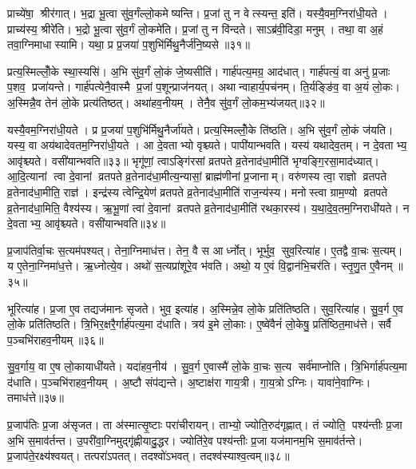 प्राच्ये॑षा॒ श्रीर॑गात्। भ॒द्रा भू॒त्वा सु॑व॒र्गंल्लो॒कमेष्यन्ति। प्र॒जां तु न वेत्स्यन्त॒ इति॑। यस्यै॒वम॒ग्निरा॑धी॒यते। प्राच्य॑स्य॒ श्रीरे॑ति। भ॒द्रो भू॒त्वा सु॑व॒र्गं लो॒कमे॑ति। प्र॒जां तु न वि॑न्दते। साऽब्र॑वी॒दिडा॒ मनुम्। तथा॒ वा अ॒हं तवा॒ग्निमाधास्यामि। यथा॒ प्र प्र॒जया॑ प॒शुभि॑र्मिथु॒नैर्ज॑नि॒ष्यसे॥३१॥

प्रत्य॒स्मिल्लोँ॒के स्था॒स्यसि॑। अ॒भि सु॑व॒र्गं लो॒कं जे॒ष्यसीति॑। गार्\mbox{}ह॑पत्य॒मग्र॒ आद॑धात्। गार्\mbox{}ह॑पत्यं॒ वा अनु॑ प्र॒जाः प॒शव॒ प्रजा॑यन्ते। गार्\mbox{}ह॑पत्येनै॒वास्मै प्र॒जां प॒शून्प्राज॑नयत्। अथान्वाहार्य॒पच॑नम्। ति॒र्यङ्ङि॑व॒ वा अ॒यं लो॒कः। अ॒स्मिन्नै॒व तेन॑ लो॒के प्रत्य॑तिष्ठत्। अथा॑हव॒नीयम्। तेनै॒व सु॑व॒र्गं लो॒कम॒भ्य॑जयत्॥३२॥

यस्यै॒वम॒ग्निरा॑धी॒यते। प्र प्र॒जया॑ प॒शुभि॑र्मिथु॒नैर्जा॑यते। प्रत्य॒स्मिल्लोँ॒के ति॑ष्ठति। अ॒भि सु॑व॒र्गं लो॒कं ज॑यति। यस्य॒ वा अय॑थादेवतम॒ग्निरा॑धी॒यते। आ दे॒वताभ्यो वृश्च्यते। पापी॑यान्भवति। यस्य॑ यथादेव॒तम्। न दे॒वताभ्य॒ आवृ॑श्च्यते। वसी॑यान्भवति॥३३॥ भृगू॑णां॒ त्वाऽङ्गि॑रसां व्रतपते व्र॒तेनाद॑धा॒मीति॑ भृग्वङ्गि॒रसा॒माद॑ध्यात्। आ॒दि॒त्यानां त्वा दे॒वानां व्रतपते व्र॒तेनाद॑धा॒मीत्य॒न्यासां॒ ब्राह्म॑णीनां प्र॒जानाम्। वरु॑णस्य त्वा॒ राज्ञो व्रतपते व्र॒तेनाद॑धा॒मीति॒ राज्ञ॑। इन्द्र॑स्य त्वेन्द्रि॒येण॑ व्रतपते व्र॒तेनाद॑धा॒मीति॑ राज॒न्य॑स्य। मनोस्त्वा ग्राम॒ण्यो व्रतपते व्र॒तेनाद॑धा॒मिति॒ वैश्य॑स्य। ऋ॒भू॒णां त्वा॑ दे॒वानां व्रतपते व्र॒तेनाद॑धा॒मीति॑ रथका॒रस्य॑। य॒था॒दे॒व॒तम॒ग्निराधी॑यते। न दे॒वताभ्य॒ आवृ॑श्च्यते। वसी॑यान्भवति॥३४॥

प्र॒जाप॑तिर्वा॒चः स॒त्यम॑पश्यत्। तेना॒ग्निमाध॑त्त। तेन॒ वै स आर्ध्नोत्। भूर्भुव॒ सुव॒रित्या॑ह। ए॒तद्वै वा॒चः स॒त्यम्। य ए॒तेना॒ग्निमा॑ध॒त्ते। ऋ॒ध्नोत्ये॒व। अथो॑ स॒त्यप्रा॑शूरे॒व भ॑वति। अथो॒ य ए॒वं वि॒द्वान॑भि॒चर॑ति। स्तृ॒णु॒त ए॒वैनम्॥३५॥

भूरित्या॑ह। प्र॒जा ए॒व तद्यज॑मानः सृजते। भुव॒ इत्या॑ह। अ॒स्मिन्ने॒व लो॒के प्रति॑तिष्ठति। सुव॒रित्या॑ह। सु॒व॒र्ग ए॒व लो॒के प्रति॑तिष्ठति। त्रि॒भिर॒क्षरै॒र्गार्\mbox{}ह॑पत्य॒मा द॑धाति। त्रय॑ इ॒मे लो॒काः। ए॒ष्वे॑वैनं॑ लो॒केषु॒ प्रति॑ष्ठित॒माध॑त्ते। सर्वै प॒ञ्चभि॑राहव॒नीयम्॥३६॥

सु॒व॒र्गाय॒ वा ए॒ष लो॒कायाधी॑यते। यदा॑हव॒नीय॑। सु॒व॒र्ग ए॒वास्मै॑ लो॒के वा॒चः स॒त्य सर्व॑माप्नोति। त्रि॒भिर्गार्\mbox{}ह॑पत्य॒मा द॑धाति। प॒ञ्चभि॑राहव॒नीयम्। अ॒ष्टौ संप॑द्यन्ते। अ॒ष्टाक्ष॑रा गाय॒त्री। गा॒य॒त्रोऽग्निः। यावा॑ने॒वाग्निः। तमाध॑त्ते॥३७॥

प्र॒जाप॑तिः प्र॒जा अ॑सृजत। ता अ॑स्मात्सृ॒ष्टाः परा॑चीरायन्। ताभ्यो॒ ज्योति॒रुद॑गृह्णात्। तं ज्योति॒ पश्य॑न्तीः प्र॒जा अ॒भि स॒माव॑र्तन्त। उ॒परी॑वा॒ग्निमुद्गृ॑ह्णीयादु॒द्धर\sn{}। ज्योति॑रे॒व पश्य॑न्तीः प्र॒जा यज॑मानम॒भि स॒माव॑र्तन्ते। प्र॒जाप॑ते॒रक्ष्य॑श्वयत्। तत्परा॑ऽपतत्। तदश्वो॑ऽभवत्। तदश्व॑स्याश्व॒त्वम्॥३८॥

